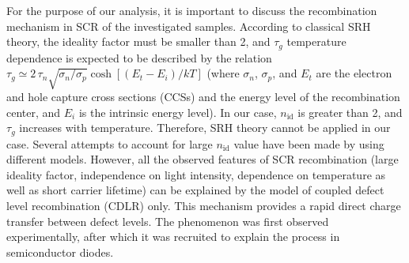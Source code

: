 \documentclass[aip,jap, amsmath,amssymb,reprint]{revtex4-1}
\begin{document}
For the purpose of our analysis, it is important to discuss the recombination mechanism in SCR of the investigated samples.
According to classical SRH theory, the ideality factor must be smaller than 2, and
$\tau_g$ temperature dependence is expected \cite{TAUg:Schroder,TAUg:Aharoni} to be described by the relation  $\tau_g\simeq2\,\tau_n\sqrt{\sigma_n/\sigma_p}\cosh\left[\left(E_t-E_i\right)/kT\right]$
(where $\sigma_n$, $\sigma_p$, and  $E_t$ are the electron and hole capture cross sections (CCSs) and the energy  level of  the  recombination  center,
and $E_i$  is the  intrinsic  energy level).
In our case, $n_{\mathrm{id}}$ is greater than 2, and $\tau_g$ increases with temperature.
Therefore, SRH theory cannot be applied in our case.
Several attempts to account for large $n_{\mathrm{id}}$ value have been made by using different models.\cite{Heide,Beier,Shah,Kaminski_n}
However, all the observed features of SCR recombination (large ideality factor, independence on light intensity, dependence on temperature
as well as short carrier lifetime) can be explained by the model of coupled defect level recombination (CDLR) \cite{CDLR:JAP1995,CDLR:JAP} only.
This mechanism provides a rapid  direct  charge  transfer  between  defect levels.
The phenomenon was first observed experimentally,\cite{DAPR:Chen1991,DAPR:Chen1994}  after which it was recruited to explain the process in semiconductor diodes. \cite{CDLR:JAP1995,CDLR:JAP,CDLR:SSP}
\end{document}
